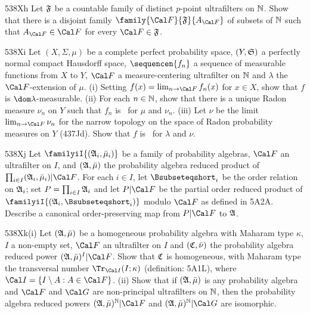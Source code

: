 {\spheader 538Xh Let $\frak F$ be a countable family of distinct $p$-point
ultrafilters on $\Bbb N$.   Show that there is a disjoint family
$\family{\Cal F}{\frak F}{A_{\Cal F}}$ of subsets of $\Bbb N$ such that
$A_{\Cal F}\in\Cal F$ for every $\Cal F\in\frak F$.

\spheader 538Xi
Let $(X,\Sigma,\mu)$ be a complete
perfect probability space, $(Y,\frak S)$ a
perfectly normal compact Hausdorff space,
$\sequencen{f_n}$ a sequence of measurable functions from $X$ to $Y$,
$\Cal F$ a measure-centering ultrafilter on $\Bbb N$ and $\lambda$ the
$\Cal F$-extension of $\mu$.   (i) Setting
$f(x)=\lim_{n\to\Cal F}f_n(x)$ for $x\in X$, show that $f$ is
$\dom\lambda$-measurable.   (ii) For each $n\in\Bbb N$, show that there is
a unique Radon measure $\nu_n$ on $Y$ such that $f_n$ is \imp\ for $\mu$
and $\nu_n$.
(iii) Let $\nu$ be the limit $\lim_{n\to\Cal F}\nu_n$ for the
narrow topology on the space of Radon probability measures on $Y$ (437Jd).
Show that $f$ is \imp\ for $\lambda$ and $\nu$.   

\spheader 538Xj Let $\familyiI{(\frak A_i,\bar\mu_i)}$ be a family of
probability algebras, $\Cal F$ an ultrafilter on $I$, and
$(\frak A,\bar\mu)$ the probability algebra reduced product of
$\prod_{i\in I}(\frak A_i,\bar\mu_i)|\Cal F$.   For each $i\in I$,
let $\Bsubseteqshort_i$ be the order relation on $\frak A_i$;  set
$P=\prod_{i\in I}\frak A_i$ and let $P|\Cal F$ be the
partial order reduced product of $\familyiI{(\frak A_i,\Bsubseteqshort_i)}$
modulo $\Cal F$ as defined in 5A2A.   Describe a canonical order-preserving
map from $P|\Cal F$ to $\frak A$.

\spheader 538Xk(i) Let $(\frak A,\bar\mu)$ be a homogeneous
probability algebra with Maharam type $\kappa$,
$I$ a non-empty set, $\Cal F$ an ultrafilter on $I$ and
$(\frak C,\bar\nu)$ the probability algebra reduced power
$(\frak A,\bar\mu)^I|\Cal F$.   Show that $\frak C$ is homogeneous, with
Maharam type the transversal number $\Tr_{\Cal I}(I;\kappa)$
(definition:  5A1L), where $\Cal I=\{I\setminus A:A\in\Cal F\}$.
(ii) %
Show that if $(\frak A,\bar\mu)$ is any probability algebra
and $\Cal F$ and $\Cal G$ are non-principal
ultrafilters on $\Bbb N$, then the probability algebra reduced powers
$(\frak A,\bar\mu)^{\Bbb N}|\Cal F$ and
$(\frak A,\bar\mu)^{\Bbb N}|\Cal G$ are isomorphic.

}
